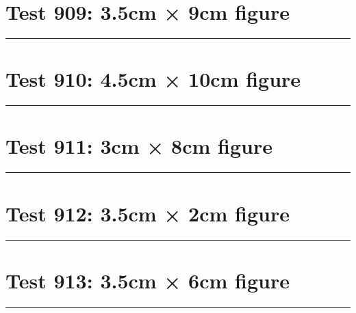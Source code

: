 \documentclass[a4paper,11pt]{article}
\begin{document}
\section*{Test 909: 3.5cm × 9cm figure}
\begin{swarmwrap}%
  \begin{minipage}[t]{3cm}
    \centering
    \rule{\linewidth}{9cm}
  \end{minipage}%
\end{swarmwrap}%
\swarmwrapnext
\lipsum[25]
\lipsum[26]
\lipsum[27]
\lipsum[28]
\lipsum[29]
\section*{Test 910: 4.5cm × 10cm figure}
\begin{swarmwrap}%
  \begin{minipage}[t]{4cm}
    \centering
    \rule{\linewidth}{10cm}
  \end{minipage}%
\end{swarmwrap}%
\swarmwrapnext
\lipsum[49]
\lipsum[50]
\lipsum[51]
\lipsum[52]
\lipsum[53]
\lipsum[54]
\section*{Test 911: 3cm × 8cm figure}
\begin{swarmwrap}%
  \begin{minipage}[t]{3cm}
    \centering
    \rule{\linewidth}{8cm}
  \end{minipage}%
\end{swarmwrap}%
\swarmwrapnext
\lipsum[49]
\lipsum[50]
\lipsum[51]
\lipsum[52]
\lipsum[53]
\section*{Test 912: 3.5cm × 2cm figure}
\begin{swarmwrap}%
  \begin{minipage}[t]{3cm}
    \centering
    \rule{\linewidth}{2cm}
  \end{minipage}%
\end{swarmwrap}%
\swarmwrapnext
\lipsum[114]
\lipsum[115]
\lipsum[116]
\lipsum[117]
\lipsum[118]
\section*{Test 913: 3.5cm × 6cm figure}
\begin{swarmwrap}%
  \begin{minipage}[t]{3cm}
    \centering
    \rule{\linewidth}{6cm}
  \end{minipage}%
\end{swarmwrap}%
\swarmwrapnext
\lipsum[70]
\lipsum[71]
\lipsum[72]
\lipsum[73]
\end{document}
